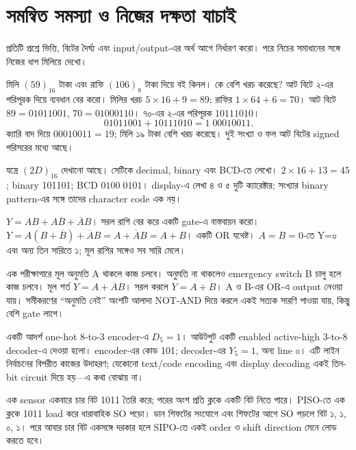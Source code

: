 \section{সমন্বিত সমস্যা ও নিজের দক্ষতা যাচাই}
প্রতিটি প্রশ্নে ভিত্তি, বিটের দৈর্ঘ্য এবং input/output-এর অর্থ আগে নির্ধারণ করো। পরে নিচের সমাধানের সঙ্গে নিজের ধাপ মিলিয়ে দেখো।

মিলি $(59)_{16}$ টাকা এবং রাফি $(106)_8$ টাকা দিয়ে বই কিনল। কে বেশি খরচ করেছে? আট বিটে ২-এর পরিপূরক দিয়ে ব্যবধান বের করো।
\chThreeAnswer মিলির খরচ $5\times16+9=89$; রাফির $1\times64+6=70$। আট বিটে $89=01011001$, $70=01000110$। ৭০-এর ২-এর পরিপূরক $10111010$।
\[01011001+10111010=1\;00010011.\]
ক্যারি বাদ দিয়ে $00010011=19$; মিলি ১৯ টাকা বেশি খরচ করেছে। দুই সংখ্যা ও ফল আট বিটের signed পরিসরের মধ্যে আছে।

যন্ত্রে $(2D)_{16}$ দেখানো আছে। সেটিকে decimal, binary এবং BCD-তে লেখো।
\chThreeAnswer $2\times16+13=45$; binary 101101; BCD $0100\;0101$। display-এ লেখা ৪ ও ৫ দুটি ক্যারেক্টার; সংখ্যার binary pattern-এর সঙ্গে তাদের character code এক নয়।

$Y=AB+A\overline B+\overline AB$। সরল রাশি বের করে একটি gate-এ বাস্তবায়ন করো।
\chThreeAnswer $Y=A(B+\overline B)+\overline AB=A+\overline AB=A+B$। একটি OR যথেষ্ট। $A=B=0$-তে Y=০ এবং অন্য তিন সারিতে ১; মূল রাশির সঙ্গেও সব সারি মেলে।

এক পরীক্ষাগারে মূল অনুমতি A থাকলে কাজ চলবে। অনুমতি না থাকলেও emergency switch B চালু হলে কাজ চলবে।
\chThreeAnswer মূল শর্ত $Y=A+\overline AB$। সরল করলে $Y=A+B$। A ও B-এর OR-এ output নেওয়া যায়। সমীকরণের ``অনুমতি নেই'' অংশটি আলাদা NOT-AND দিয়ে করলে একই সত্যক সারণি পাওয়া যায়, কিন্তু বেশি gate লাগে।

একটি আদর্শ one-hot 8-to-3 encoder-এ $D_5=1$। আউটপুট একটি enabled active-high 3-to-8 decoder-এ দেওয়া হলো।
\chThreeAnswer encoder-এর কোড 101; decoder-এর $Y_5=1$, অন্য line ০। এটি লাইন নির্বাচনের বিপরীত কাজের উদাহরণ; যেকোনো text/code encoding এবং display decoding একই তিন-bit circuit দিয়ে হয়—এ কথা বোঝায় না।

এক sensor একবারে চার বিট 1011 তৈরি করে; পরের অংশ প্রতি ক্লকে একটি বিট নিতে পারে।
\chThreeAnswer PISO-তে এক ক্লকে 1011 load করে ধারাবাহিক SO পড়ো। ডান শিফটের সংযোগে এবং শিফটের আগে SO পড়লে বিট ১, ১, ০, ১। পরে আবার চার বিট একসঙ্গে দরকার হলে SIPO-তে একই order ও shift direction মেনে লোড করতে হবে।

